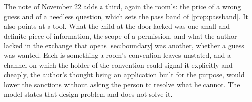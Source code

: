 The note of November 22 adds a third, again the room's: the price of a wrong guess and of a needless question, which sets the pass band of \autoref{prop:passband}. It also points at a tool. What the child at the door lacked was one small and definite piece of information, the scope of a permission, and what the author lacked in the exchange that opens \autoref{sec:boundary} was another, whether a guess was wanted. Each is something a room's convention leaves unstated, and a channel on which the holder of the convention could signal it explicitly and cheaply, the author's thought being an application built for the purpose, would lower the sanctions without asking the person to resolve what he cannot. The model states that design problem and does not solve it.

